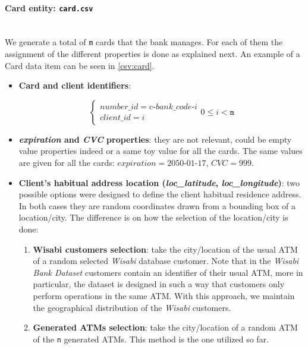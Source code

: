 \paragraph{Card entity: \texttt{card.csv}\\\\}

We generate a total of \texttt{m} cards that the bank manages. For each of them the assignment of the different properties is done as explained next. An example of a Card data item can be seen in \ref{csv:card}.

\begin{itemize}
\item \textbf{Card and client identifiers}:

\[
\begin{cases} 
number\_id = \text{c-}bank\_code\text{-}i \\
client\_id = i 
\end{cases}
0 \leq i < \texttt{m}
\]

\item \textbf{\emph{expiration} and \emph{CVC} properties}: they are not relevant, could be empty value properties indeed or a same toy value for all the cards. The same values are given for all the cards: $expiration = \text{2050-01-17}$, $CVC = 999$.

\item \textbf{Client's habitual address location (\emph{loc\_latitude}, \emph{loc\_longitude})}: two possible options were designed to define the client habitual residence address. In both 
cases they are random 
coordinates drawn from a bounding box of a location/city. The difference is on how the selection of the location/city is done:

  \begin{enumerate}
      \item \textbf{Wisabi customers selection}: take the city/location of the usual ATM of a random selected \emph{Wisabi} database customer. Note that in the \emph{Wisabi Bank Dataset} customers contain an identifier
      of their usual ATM, more in particular, the dataset is designed in such a way that customers
      only perform operations in the same ATM.
      With this approach, we maintain the geographical distribution of the \emph{Wisabi} customers.
      \item \textbf{Generated ATMs selection}: take the city/location of a random ATM of the \texttt{n} generated ATMs. This method is the one utilized so far.
  \end{enumerate}


\end{itemize}
